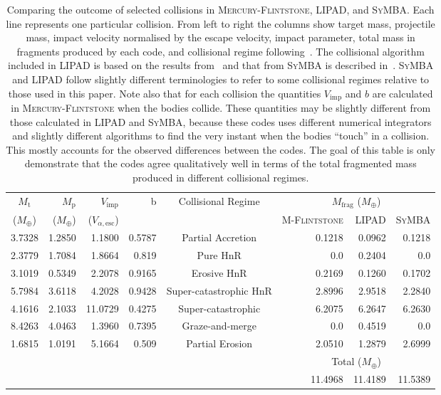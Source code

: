 \documentclass[fleqn,usenatbib]{mnras}
\begin{document}
\begin{table*}
\begin{tabular}{crrrcrrr}
\hline
$M_{\text{t}}$   & $M_{\text{p}}$   & $V_{\text{imp}}$   & \multirow{2}{*}{b}      & \multirow{2}{*}{Collisional Regime} &  \multicolumn{3}{c}{$M_{\text{frag}}$ ($M_{\oplus}$)}\\
($M_{\oplus}$) & ($M_{\oplus}$) & ($V_{\alpha,\text{esc}}$) &        &    &  \textsc{M-Flintstone}      & \textsc{LIPAD}   & \textsc{SyMBA}                           \\ \hline
3.7328 & 1.2850  & 1.1800     & 0.5787  & Partial Accretion        & 0.1218  & 0.0962  & 0.1218                   \\
2.3779 & 1.7084 & 1.8664   & 0.819      & Pure HnR      & 0.0     & 0.2404  & 0.0                  \\
3.1019 & 0.5349 & 2.2078   & 0.9165  & Erosive HnR      & 0.2169  & 0.1260  & 0.1702                  \\
5.7984 & 3.6118 & 4.2028   & 0.9428  & Super-catastrophic HnR  & 2.8996  & 2.9518  & 2.2840                     \\
4.1616 & 2.1033 & 11.0729  & 0.4275  & Super-catastrophic   & 6.2075  & 6.2647  & 6.2630                        \\
8.4263 & 4.0463 & 1.3960    & 0.7395 & Graze-and-merge  & 0.0     & 0.4519  & 0.0                             \\
1.6815 & 1.0191 & 5.1664   & 0.509  & Partial Erosion & 2.0510  & 1.2879  & 2.6999                           \\ \hline
 &  &    &   &  &  \multicolumn{3}{c}{Total ($M_{\oplus}$)}\\
 &  &    &   &  & 11.4968  & 11.4189  & 11.5389                           \\ \hline
\end{tabular}
\caption{\label{tab:colls} Comparing the outcome of selected collisions in \textsc{Mercury-Flintstone}, \textsc{LIPAD}, and \textsc{SyMBA}. Each line represents one particular collision. From left to right the columns show target mass, projectile mass, impact velocity normalised by the escape velocity, impact parameter, total mass in fragments produced by each code, and collisional regime following~\protect\cite{leinhardt2012}. The collisional algorithm included in \textsc{LIPAD} is based on the results from~\protect\cite{benzasphaug99} and that from \textsc{SyMBA} is described in~\protect\cite{chambers13}. \textsc{SyMBA} and \textsc{LIPAD} follow slightly different terminologies to refer to some collisional regimes relative to those used in this paper. Note also that for each collision the quantities $V_{\text{imp}}$  and $b$ are calculated in \textsc{Mercury-Flintstone} when the bodies collide. These quantities may be slightly different from those calculated in \textsc{LIPAD} and \textsc{SyMBA}, because these codes uses different numerical integrators and slightly different algorithms to find the very instant  when the bodies ``touch'' in a collision. This mostly accounts for the observed differences between the codes. The goal of this table is only demonstrate that the codes agree qualitatively well in terms of the total fragmented mass produced in different collisional regimes.}

\end{table*}
\end{document}
